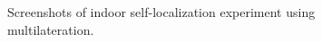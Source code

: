 \begin{figure}

  \caption{Screenshots of indoor self-localization experiment using multilateration.}
  \label{fig:beacon_eval_multilat}
\end{figure}


